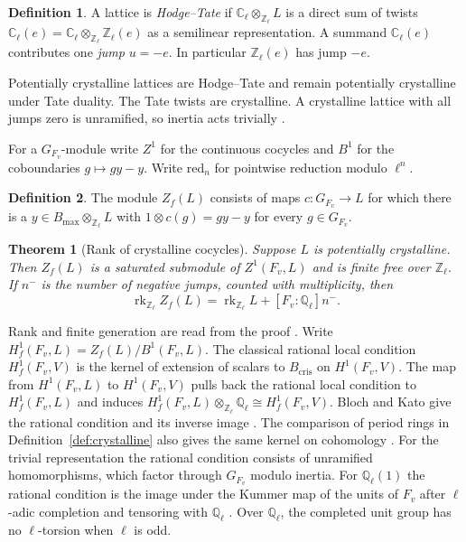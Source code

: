 \documentclass[reqno]{amsart}
\theoremstyle{definition}
\newtheorem{definition}{Definition}[section]
\theoremstyle{plain}
\newtheorem{theorem}{Theorem}[section]
\theoremstyle{remark}
\newcommand{\Z}{\mathbb Z}
\newcommand{\Q}{\mathbb Q}
\newcommand{\C}{\mathbb C}
\newcommand{\Bmax}{B_{\max}}
\newcommand{\Bcris}{B_{\mathrm{cris}}}
\newcommand{\rk}{\operatorname{rk}}
\begin{document}
\begin{definition}\label{def:jump}
A lattice is \emph{Hodge--Tate} if \(\C_\ell\otimes_{\Z_\ell} L\) is a
direct sum of twists \(\C_\ell(e)=\C_\ell\otimes_{\Z_\ell}\Z_\ell(e)\)
as a semilinear representation. A summand \(\C_\ell(e)\) contributes
one \emph{jump} \(u=-e\). In particular \(\Z_\ell(e)\) has jump \(-e\).
\end{definition}

Potentially crystalline lattices are Hodge--Tate and remain potentially
crystalline under Tate duality. The Tate twists are crystalline. A crystalline
lattice with all jumps zero is unramified, so inertia acts trivially
\cite{Fo}.

For a \(G_{F_v}\)-module write \(Z^1\) for the continuous cocycles and
\(B^1\) for the coboundaries \(g\mapsto gy-y\).
Write \(\mathrm{red}_n\) for pointwise reduction modulo \(\ell^n\).

\begin{definition}\label{def:Zf}
The module \(Z_f(L)\) consists of maps \(c\colon G_{F_v}\to L\) for which
there is a \(y\in\Bmax\otimes_{\Z_\ell}L\) with
\(1\otimes c(g)=gy-y\) for every \(g\in G_{F_v}\).
\end{definition}

\begin{theorem}[Rank of crystalline cocycles]\label{thm:rank}
Suppose \(L\) is potentially crystalline. Then \(Z_f(L)\) is a
saturated submodule of \(Z^1(F_v,L)\) and is finite free over \(\Z_\ell\).
If \(n^-\) is the number of negative jumps, counted with multiplicity, then
\[
  \rk_{\Z_\ell} Z_f(L)=\rk_{\Z_\ell} L+[F_v:\Q_\ell]n^- .
\]
\end{theorem}

Rank and finite generation are read from the proof \cite{GL}.
Write \(H^1_f(F_v,L)=Z_f(L)/B^1(F_v,L)\). The classical rational local
condition \(H^1_f(F_v,V)\) is the kernel of extension of scalars to
\(\Bcris\) on \(H^1(F_v,V)\). The map from \(H^1(F_v,L)\) to \(H^1(F_v,V)\)
pulls back the rational local condition to \(H^1_f(F_v,L)\) and induces
\(H^1_f(F_v,L)\otimes_{\Z_\ell}\Q_\ell\cong H^1_f(F_v,V)\).
Bloch and Kato give the rational condition and its inverse image
\cite[\S3]{BK}. The comparison of period rings in
Definition~\ref{def:crystalline} also gives the same kernel on cohomology
\cite{Co}. For the trivial representation the
rational condition consists of unramified homomorphisms, which factor
through \(G_{F_v}\) modulo inertia. For \(\Q_\ell(1)\) the rational
condition is the image under the Kummer map of the units of \(F_v\)
after \(\ell\)-adic completion and tensoring with \(\Q_\ell\)
\cite[Example~3.9]{BK}. Over \(\Q_\ell\), the completed unit group has
no \(\ell\)-torsion when \(\ell\) is odd.
\end{document}
